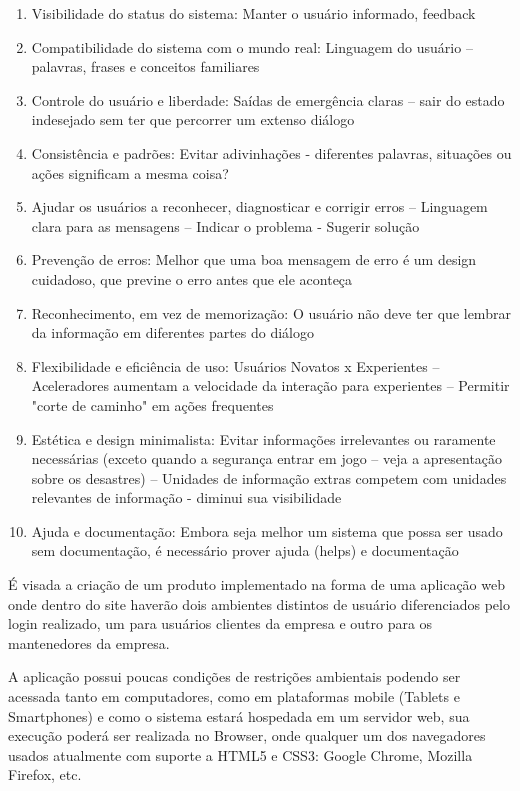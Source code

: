 \begin{enumerate}
	\item Visibilidade do status do sistema: Manter o usuário informado, feedback
	\item Compatibilidade do sistema com o mundo real: Linguagem do usuário -- palavras, frases e conceitos familiares 
	\item Controle do usuário e liberdade: Saídas de emergência claras -- sair do estado indesejado sem ter que percorrer um extenso diálogo
	\item Consistência e padrões: Evitar adivinhações - diferentes palavras, situações ou ações significam a mesma coisa?
	\item Ajudar os usuários a reconhecer, diagnosticar e corrigir erros -- Linguagem clara para as mensagens -- Indicar o problema - Sugerir solução 
	\item Prevenção de erros: Melhor que uma boa mensagem de erro é um design cuidadoso, que previne o erro antes que ele aconteça
	\item Reconhecimento, em vez de memorização: O usuário não deve ter que lembrar da informação em diferentes partes do diálogo 
	\item Flexibilidade e eficiência de uso: Usuários Novatos x Experientes -- Aceleradores aumentam a velocidade da interação para experientes – Permitir "corte de caminho" em ações frequentes 
	\item Estética e design minimalista: Evitar informações irrelevantes ou raramente necessárias (exceto quando a segurança entrar em jogo – veja a apresentação sobre os desastres) -- Unidades de informação extras competem com unidades relevantes de informação - diminui sua visibilidade 
	\item Ajuda e documentação: Embora seja melhor um sistema que possa ser usado sem documentação, é necessário prover ajuda (helps) e documentação
\end{enumerate}

É visada a criação de um produto implementado na forma de uma aplicação web onde dentro do site haverão dois ambientes distintos de usuário diferenciados pelo login realizado, um para usuários clientes da empresa e outro para os mantenedores da empresa.

A aplicação possui poucas condições de restrições ambientais podendo ser acessada tanto em computadores, como em plataformas mobile (Tablets e Smartphones) e como o sistema estará hospedada em um servidor web, sua execução poderá ser realizada no Browser, onde qualquer um dos navegadores usados atualmente com suporte a HTML5 e CSS3: Google Chrome, Mozilla Firefox, etc.


